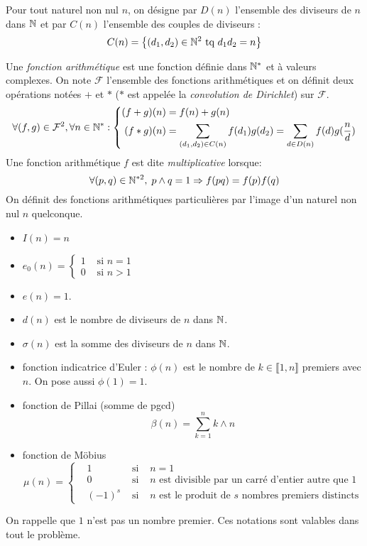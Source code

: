 Pour tout naturel non nul $n$, on désigne par $D(n)$ l'ensemble des diviseurs de $n$ dans $\mathbb{N}$ et par $C(n)$ l'ensemble des couples de diviseurs :
\begin{displaymath}
 C(n)= \left\lbrace (d_1,d_2)\in \mathbb{N}^2 \text{ tq } d_1d_2 = n\right\rbrace 
\end{displaymath}

Une \emph{fonction arithmétique} est une fonction définie dans $\mathbb{N}^*$ et à valeurs complexes. On note $\mathcal{F}$ l'ensemble des fonctions arithmétiques et on définit deux opérations notées $+$ et $*$ ($*$ est appelée la \emph{convolution de Dirichlet}) sur $\mathcal{F}$.
\begin{displaymath}
 \forall(f,g)\in \mathcal{F}^2, \forall n \in \mathbb{N}^*:
\left\lbrace 
\begin{aligned}
 (f+g)(n) &= f(n) + g(n) \\
 (f*g)(n) &= \sum_{(d_1,d_2)\in C(n)}f(d_1)g(d_2)
= \sum_{d\in D(n)} f(d)g(\frac{n}{d})
\end{aligned}
\right. 
\end{displaymath}
Une fonction arithmétique $f$ est dite \emph{multiplicative} lorsque:
\begin{displaymath}
 \forall (p,q)\in \mathbb{N}^{*2}, \; p\wedge q = 1 \Rightarrow f(pq) = f(p)f(q)
\end{displaymath}
On définit des fonctions arithmétiques particulières par l'image d'un naturel non nul $n$ quelconque.
\begin{itemize}
 \item $I(n)=n$
 \item $ e_0(n) = 
\left\lbrace 
\begin{aligned}
 1 &\text{ si } n=1 \\ 0 &\text{ si } n>1 
\end{aligned}
\right. 
$
\item $e(n)=1$.
\item $d(n)$ est le nombre de diviseurs de $n$ dans $\mathbb{N}$.
\item $\sigma(n)$ est la somme des diviseurs de $n$ dans $\mathbb{N}$.
\item fonction indicatrice d'Euler : $\phi(n)$ est le nombre de $k\in \llbracket 1,n\rrbracket$ premiers avec $n$. On pose aussi $\phi(1)=1$.
\item fonction de Pillai (somme de pgcd)
\begin{displaymath}
 \beta(n) = \sum_{k=1}^n k\wedge n
\end{displaymath}
\item fonction de Möbius
\begin{displaymath}
 \mu(n)=
\left\lbrace 
\begin{aligned}
 &1 &\text{ si } &n=1 \\
 &0 &\text{ si } &n \text{ est divisible par un carré d'entier autre que 1}\\
 &(-1)^s &\text{ si } &n \text{ est le produit de $s$ nombres premiers distincts}
\end{aligned}
\right. 
\end{displaymath}
\end{itemize}
On rappelle que $1$ n'est pas un nombre premier. Ces notations sont valables dans tout le problème.


